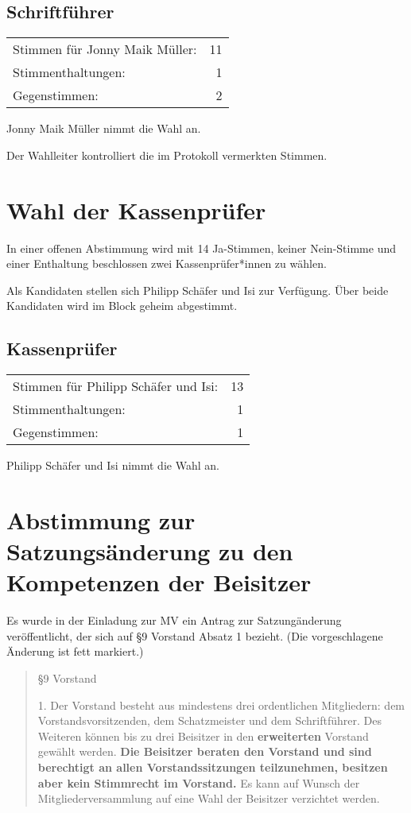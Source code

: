 \documentclass[DIV=calc,parksip=half*]{scrartcl}
\newcommand{\fiveop}{Philipp Schäfer}
\newcommand{\jonny}{Jonny Maik Müller}
\newcommand{\isi}{Isi}
\begin{document}
\subsection{Schriftführer}
\begin{tabularx}{\linewidth}{Xr}
Stimmen für \jonny{}: & 11\\
Stimmenthaltungen: & 1\\
Gegenstimmen: & 2
\end{tabularx}
\jonny{} nimmt die Wahl an.

Der Wahlleiter kontrolliert die im Protokoll vermerkten Stimmen.

\section{Wahl der Kassenprüfer}

In einer offenen Abstimmung wird mit 14 Ja-Stimmen, keiner Nein-Stimme und einer Enthaltung beschlossen zwei Kassenprüfer*innen zu wählen.

Als Kandidaten stellen sich \fiveop{} und \isi{} zur Verfügung. Über beide
Kandidaten wird im Block geheim abgestimmt.

\subsection{Kassenprüfer}
\begin{tabularx}{\linewidth}{Xr}
Stimmen für \fiveop{} und \isi{}: & 13\\
Stimmenthaltungen: & 1\\
Gegenstimmen: & 1
\end{tabularx}

\fiveop{} und \isi{} nimmt die Wahl an.
\section{Abstimmung zur Satzungsänderung zu den Kompetenzen der Beisitzer}

Es wurde in der Einladung zur MV ein Antrag zur Satzungänderung veröffentlicht, der sich auf §9 Vorstand Absatz 1 bezieht. (Die vorgeschlagene Änderung ist fett markiert.)

\begin{quote}
§9 Vorstand

 1. Der Vorstand besteht aus mindestens drei ordentlichen Mitgliedern: dem Vorstandsvorsitzenden, dem Schatzmeister und dem Schriftführer. Des Weiteren können bis zu drei Beisitzer in den \textbf{erweiterten} Vorstand gewählt werden. \textbf{Die Beisitzer beraten den Vorstand und sind berechtigt an allen Vorstandssitzungen teilzunehmen, besitzen aber kein Stimmrecht im Vorstand.} Es kann auf Wunsch der Mitgliederversammlung auf eine Wahl der Beisitzer verzichtet werden.
\end{quote}
\end{document}
